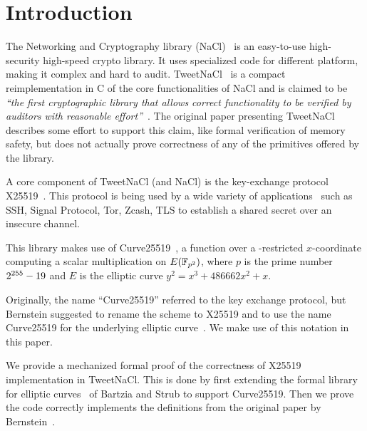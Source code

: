 \section{Introduction}
\label{sec:intro}

The Networking and Cryptography library (NaCl)~\cite{BLS12} 
is an easy-to-use high-security high-speed crypto library.
It uses specialized code for different platform, making it complex and hard to audit.
TweetNaCl~\cite{BGJ+15} is a compact reimplementation in C
of the core functionalities of NaCl and is claimed to be 
\emph{``the first cryptographic library that allows correct functionality
to be verified by auditors with reasonable effort''}~\cite{BGJ+15}.
The original paper presenting TweetNaCl describes some effort to support
this claim, like formal verification of memory safety, but does not actually
prove correctness of any of the primitives offered by the library.

A core component of TweetNaCl (and NaCl) is the key-exchange protocol X25519~\cite{rfc7748}.
This protocol is being used by a wide variety of applications~\cite{things-that-use-curve25519}
such as SSH, Signal Protocol, Tor, Zcash, TLS to establish a shared secret over
an insecure channel.



This library makes use of Curve25519~\cite{Ber06}, a function over a -restricted
$x$-coordinate computing a scalar multiplication on $E(\mathbb{F}_{p^2})$, where $p$ is
the prime number $2^{255}-19$ and $E$ is the elliptic curve $y^2 = x^3 + 486662 x^2 + x$.

Originally, the name ``Curve25519'' referred to the key exchange protocol,
but Bernstein suggested to rename the scheme to X25519 and to use the name
Curve25519 for the underlying elliptic curve~\cite{Ber14}.
We make use of this notation in this paper.

We provide a mechanized formal proof of the correctness of X25519
implementation in TweetNaCl. This is done by first extending the formal library for
elliptic curves~\cite{DBLP:conf/itp/BartziaS14} of Bartzia and Strub to
support Curve25519. Then we prove the code correctly implements the definitions
from the original paper by Bernstein~\cite{Ber14}.

